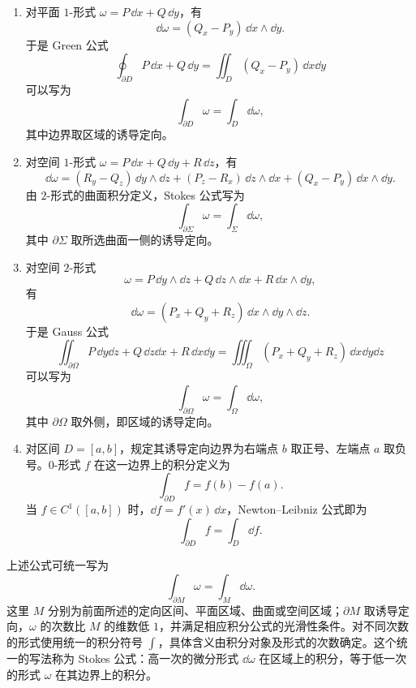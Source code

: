 \begin{enumerate}
\item 对平面 $1$-形式 $\omega=P\,\dd x+Q\,\dd y$，有
\[
\dd\omega=(Q_x-P_y)\,\dd x\wedge\dd y.
\]
于是 Green 公式
\[
\oint_{\partial D}P\,\dd x+Q\,\dd y
=\displaystyle\iint_D(Q_x-P_y)\,\dd x\dd y
\]
可以写为
\[
\int_{\partial D}\omega=\int_D\dd\omega,
\]
其中边界取区域的诱导定向。

\item 对空间 $1$-形式 $\omega=P\,\dd x+Q\,\dd y+R\,\dd z$，有
\[
\dd\omega=(R_y-Q_z)\,\dd y\wedge\dd z
 +(P_z-R_x)\,\dd z\wedge\dd x+(Q_x-P_y)\,\dd x\wedge\dd y.
\]
由 $2$-形式的曲面积分定义，Stokes 公式写为
\[
\int_{\partial\Sigma}\omega=\int_\Sigma\dd\omega,
\]
其中 $\partial\Sigma$ 取所选曲面一侧的诱导定向。

\item 对空间 $2$-形式
\[
\omega=P\,\dd y\wedge\dd z+Q\,\dd z\wedge\dd x+R\,\dd x\wedge\dd y,
\]
有
\[
\dd\omega=(P_x+Q_y+R_z)\,\dd x\wedge\dd y\wedge\dd z.
\]
于是 Gauss 公式
\[
\displaystyle\iint_{\partial\Omega}P\,\dd y\dd z+Q\,\dd z\dd x+R\,\dd x\dd y
=\iiint_\Omega(P_x+Q_y+R_z)\,\dd x\dd y\dd z
\]
可以写为
\[
\int_{\partial\Omega}\omega=\int_\Omega\dd\omega,
\]
其中 $\partial\Omega$ 取外侧，即区域的诱导定向。

\item 对区间 $D=[a,b]$，规定其诱导定向边界为右端点 $b$ 取正号、左端点 $a$ 取负号。$0$-形式 $f$ 在这一边界上的积分定义为
\[
\int_{\partial D}f=f(b)-f(a).
\]
当 $f\in C^1([a,b])$ 时，$\dd f=f'(x)\,\dd x$，Newton--Leibniz 公式即为
\[
\int_{\partial D}f=\int_D\dd f.
\]
\end{enumerate}

上述公式可统一写为
\[
\boxed{\int_{\partial M}\omega=\int_M\dd\omega.}
\]
这里 $M$ 分别为前面所述的定向区间、平面区域、曲面或空间区域；$\partial M$ 取诱导定向，$\omega$ 的次数比 $M$ 的维数低 $1$，并满足相应积分公式的光滑性条件。对不同次数的形式使用统一的积分符号 $\displaystyle \int$，具体含义由积分对象及形式的次数确定。这个统一的写法称为 Stokes 公式：高一次的微分形式 $\dd\omega$ 在区域上的积分，等于低一次的形式 $\omega$ 在其边界上的积分。
